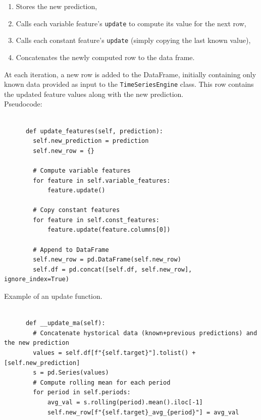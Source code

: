 \documentclass{Configuration_Files/PoliMi3i_thesis}
\begin{document}
\begin{enumerate}
	\item Stores the new prediction,
	\item Calls each variable feature’s \texttt{update} to compute its value for the next row,
	\item Calls each constant feature’s \texttt{update} (simply copying the last known value),
	\item Concatenates the newly computed row to the data frame.
\end{enumerate}
At each iteration, a new row is added to the DataFrame, initially containing only known data provided as input to the \texttt{TimeSeriesEngine} class. This row contains the updated feature values along with the new prediction.
\\Pseudocode:
\begin{verbatim}

      def update_features(self, prediction):
        self.new_prediction = prediction
        self.new_row = {}

        # Compute variable features
        for feature in self.variable_features:
            feature.update()

        # Copy constant features
        for feature in self.const_features:
            feature.update(feature.columns[0])

        # Append to DataFrame
        self.new_row = pd.DataFrame(self.new_row)
        self.df = pd.concat([self.df, self.new_row], ignore_index=True)

      \end{verbatim}

Example of an update function.
\begin{verbatim}

      def __update_ma(self):
        # Concatenate hystorical data (known+previous predictions) and the new prediction
        values = self.df[f"{self.target}"].tolist() + [self.new_prediction]
        s = pd.Series(values)
        # Compute rolling mean for each period
        for period in self.periods:
            avg_val = s.rolling(period).mean().iloc[-1]
            self.new_row[f"{self.target}_avg_{period}"] = avg_val

      \end{verbatim}
\end{document}
